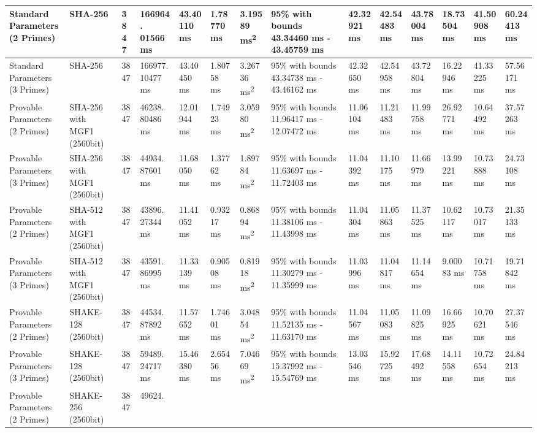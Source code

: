 \documentclass[]{final_report}
\theoremstyle{definition}
\begin{document}
\begin{landscape}
\begin{longtable}{|p{2.3cm}|p{1.8cm}|p{1.0cm}|p{1.7cm}|p{1.4cm}|p{1.5cm}|p{1.8cm}|p{1.5cm}|p{1.43cm}|p{1.5cm}|p{1.3cm}|p{1.4cm}|p{1.3cm}|p{1.3cm}|}
\hline
\endlastfoot
Standard Parameters (2 Primes) & SHA-256 & 3847 & 166964.
01566 ms & 43.40110 ms & 1.78770 ms & 3.19589 ms\textsuperscript{2} & 95\% with bounds 43.34460 ms - 43.45759 ms & 42.32921 ms & 42.54483 ms & 43.78004 ms & 18.73504 ms & 41.50908 ms & 60.24413 ms \\
\hline
Standard Parameters (3 Primes) & SHA-256 & 3847 & 166977.
10477 ms & 43.40450 ms & 1.80758 ms & 3.26736 ms\textsuperscript{2} & 95\% with bounds 43.34738 ms - 43.46162 ms & 42.32650 ms & 42.54958 ms & 43.72804 ms & 16.22946 ms & 41.33225 ms & 57.56171 ms \\
\hline
Provable Parameters (2 Primes) & SHA-256 with MGF1 (2560bit) & 3847 & 46238.
80486 ms & 12.01944 ms & 1.74923 ms & 3.05980 ms\textsuperscript{2} & 95\% with bounds 11.96417 ms - 12.07472 ms & 11.06104 ms & 11.21483 ms & 11.99758 ms & 26.92771 ms & 10.64492 ms & 37.57263 ms \\
\hline
Provable Parameters (3 Primes) & SHA-256 with MGF1 (2560bit) & 3847 & 44934.
87601 ms & 11.68050 ms & 1.37762 ms & 1.89784 ms\textsuperscript{2} & 95\% with bounds 11.63697 ms - 11.72403 ms & 11.04392 ms & 11.10175 ms & 11.66979 ms & 13.99221 ms & 10.73888 ms & 24.73108 ms \\
\hline
Provable Parameters (2 Primes) & SHA-512 with MGF1 (2560bit) & 3847 & 43896.
27344 ms & 11.41052 ms & 0.93217 ms & 0.86894 ms\textsuperscript{2} & 95\% with bounds 11.38106 ms - 11.43998 ms & 11.04304 ms & 11.05863 ms & 11.37525 ms & 10.62117 ms & 10.73017 ms & 21.35133 ms \\
\hline
Provable Parameters (3 Primes) & SHA-512 with MGF1 (2560bit) & 3847 & 43591.
86995 ms & 11.33139 ms & 0.90508 ms & 0.81918 ms\textsuperscript{2} & 95\% with bounds 11.30279 ms - 11.35999 ms & 11.03996 ms & 11.04817 ms & 11.14654 ms & 9.00083 ms & 10.71758 ms & 19.71842 ms \\
\hline
Provable Parameters (2 Primes) & SHAKE-128 (2560bit) & 3847 & 44534.
87892 ms & 11.57652 ms & 1.74601 ms & 3.04854 ms\textsuperscript{2} & 95\% with bounds 11.52135 ms - 11.63170 ms & 11.04567 ms & 11.05083 ms & 11.09825 ms & 16.66925 ms & 10.70621 ms & 27.37546 ms \\
\hline
Provable Parameters (3 Primes) & SHAKE-128 (2560bit) & 3847 & 59489.
24717 ms & 15.46380 ms & 2.65456 ms & 7.04669 ms\textsuperscript{2} & 95\% with bounds 15.37992 ms - 15.54769 ms & 13.03546 ms & 15.92725 ms & 17.68492 ms & 14.11558 ms & 10.72654 ms & 24.84213 ms \\
\hline
Provable Parameters (2 Primes) & SHAKE-256 (2560bit) & 3847 & 49624.

\end{longtable}
\end{landscape}
\end{document}
